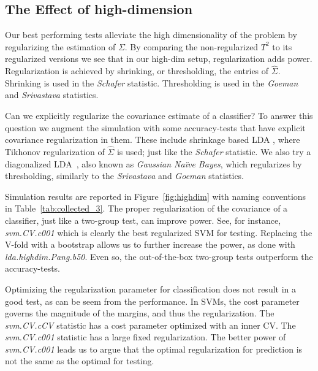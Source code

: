 \documentclass[]{bio}
\begin{document}
\subsection{The Effect of high-dimension}
\label{sec:highdim}

Our best performing tests alleviate the high dimensionality of the problem by regularizing the estimation of $\Sigma$. 
By comparing the non-regularized $T^2$ to its regularized versions we see that in our high-dim setup, regularization adds power. 
Regularization is achieved by shrinking, or thresholding, the entries of $\hat{\Sigma}$.
Shrinking is used in the \emph{Schafer} statistic.
Thresholding is used in the \emph{Goeman} and \emph{Srivastava} statistics.

Can we explicitly regularize the covariance estimate of a classifier?
To answer this question we augment the simulation with some accuracy-tests that have explicit covariance regularization in them. 
These include shrinkage based LDA \cite{pang_shrinkage-based_2009,ramey_high-dimensional_2016}, where Tikhonov regularization of $\hat \Sigma$ is used; just like the \emph{Schafer} statistic.
We also try a diagonalized LDA~\cite{dudoit_comparison_2002}, also known as \emph{Gaussian Na\"ive Bayes}, which regularizes by thresholding, similarly to the \emph{Srivastava} and \emph{Goeman} statistics.

Simulation results are reported in Figure~\ref{fig:highdim} with naming conventions in Table~\ref{tab:collected_3}.
The proper regularization of the covariance of a classifier, just like a two-group test, can improve power. 
See, for instance, \emph{svm.CV.c001} which is clearly the best regularized SVM for testing. 
Replacing the V-fold  with a bootstrap allows us to further increase the power, as done with \emph{lda.highdim.Pang.b50}.
Even so, the out-of-the-box two-group tests outperform the accuracy-tests.

Optimizing the regularization parameter for classification does not result in a good test, as can be seem from the performance.
In SVMs, the cost parameter governs the magnitude of the margins, and thus the regularization. 
The  \emph{svm.CV.cCV} statistic has a cost parameter optimized with an inner CV. 
The \emph{svm.CV.c001} statistic has a large fixed regularization.
The better power of \emph{svm.CV.c001} leads us to argue that the optimal regularization for prediction is not the same as the optimal for testing.

\bigskip
\end{document}
